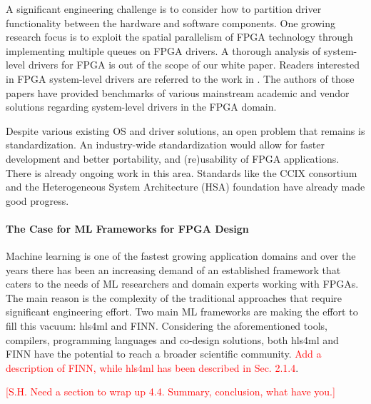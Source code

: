 A significant engineering challenge is to consider how to partition driver functionality between the hardware and software components. One growing research focus is to exploit the spatial parallelism of FPGA technology through implementing multiple queues on FPGA drivers. A thorough analysis of system-level drivers for FPGA is out of the scope of our white paper. Readers interested in FPGA system-level drivers are referred to the work in \cite{fpga_drivers, fpgadrivers2}. The authors of those papers have provided benchmarks of various mainstream academic and vendor solutions regarding system-level drivers in the FPGA domain. 

Despite various existing OS and driver solutions, an open problem that remains is standardization. An industry-wide standardization would allow for faster development and better portability, and (re)usability of FPGA applications. There is already ongoing work in this area. Standards like the CCIX consortium \cite{ccix} and the Heterogeneous System Architecture (HSA) foundation \cite{hsa}  have already made good progress.

\paragraph*{The Case for ML Frameworks for FPGA Design}

Machine learning is one of the fastest growing application domains and over the years there has been an increasing demand of an established framework that caters to the needs of ML researchers and domain experts working with FPGAs. The main reason is the complexity of the traditional approaches that require significant engineering effort. Two main ML frameworks are making the effort to fill this vacuum: hls4ml and FINN. Considering the aforementioned tools, compilers, programming languages and co-design solutions, both hls4ml and FINN have the potential to reach a broader scientific community. \textcolor{red}{Add a description of FINN, while hls4ml has been described in Sec. 2.1.4}.

\textcolor{red}{[S.H. Need a section to wrap up 4.4.  Summary, conclusion, what have you.]}

